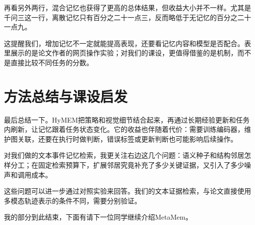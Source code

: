 \documentclass[UTF8,fontset=fandol]{ctexart}
\providecommand{\nextspeakername}{下一位}
\begin{document}
再看另外两行，混合记忆也获得了更高的总体结果，但收益大小并不一样。尤其是千问三这一行，离散记忆只有百分之二十一点三，反而略低于无记忆的百分之二十一点九。

这提醒我们，增加记忆不一定就能提高表现，还要看记忆内容和模型是否配合。表里展示的是论文作者的网页操作实验；对我们的课设，更值得借鉴的是机制，而不是直接比较不同任务的分数。
\clearpage
{}
\section*{方法总结与课设启发}
最后总结一下。HyMEM把策略和视觉细节结合起来，再通过长期经验更新和任务内刷新，让记忆跟着任务状态变化。它的收益也伴随着代价：需要训练编码器，维护图关联，还要在执行时做判断，错误标签或更新判断也可能影响后续操作。

对我们做的文本事件记忆检索，我更关注右边这几个问题：语义种子和结构邻居怎样分工；在固定检索预算下，扩展邻居究竟补充了多少关键证据，又引入了多少噪声和调用成本。

这些问题可以进一步通过对照实验来回答。我们的文本证据检索，与论文直接使用多模态轨迹表示的条件不同，需要分别验证。

我的部分到此结束，下面有请\nextspeakername{}同学继续介绍MetaMem。
\end{document}
